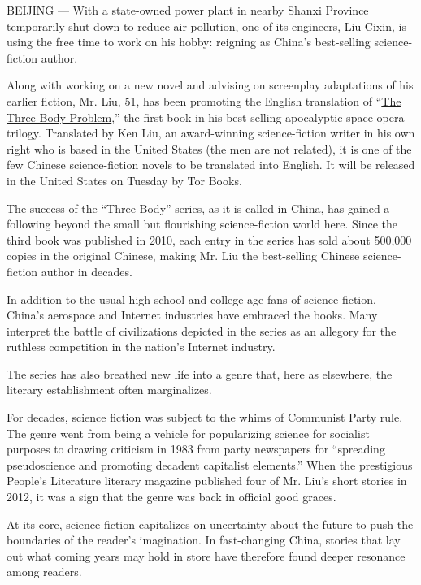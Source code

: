 BEIJING --- With a state-owned power plant in nearby Shanxi Province
temporarily shut down to reduce air pollution, one of its engineers, Liu
Cixin, is using the free time to work on his hobby: reigning as China's
best-selling science-fiction author.

Along with working on a new novel and advising on screenplay adaptations
of his earlier fiction, Mr. Liu, 51, has been promoting the English
translation of
``\href{http://www.tor.com/blogs/2014/10/repost-the-worst-of-all-possible-universes-and-the-best-of-all-possible-earths-three-body-and-chinese-science-fiction}{The
Three-Body Problem},'' the first book in his best-selling apocalyptic
space opera trilogy. Translated by Ken Liu, an award-winning
science-fiction writer in his own right who is based in the United
States (the men are not related), it is one of the few Chinese
science-fiction novels to be translated into English. It will be
released in the United States on Tuesday by Tor Books.

The success of the ``Three-Body'' series, as it is called in China, has
gained a following beyond the small but flourishing science-fiction
world here. Since the third book was published in 2010, each entry in
the series has sold about 500,000 copies in the original Chinese, making
Mr. Liu the best-selling Chinese science-fiction author in decades.

In addition to the usual high school and college-age fans of science
fiction, China's aerospace and Internet industries have embraced the
books. Many interpret the battle of civilizations depicted in the series
as an allegory for the ruthless competition in the nation's Internet
industry.

The series has also breathed new life into a genre that, here as
elsewhere, the literary establishment often marginalizes.

For decades, science fiction was subject to the whims of Communist Party
rule. The genre went from being a vehicle for popularizing science for
socialist purposes to drawing criticism in 1983 from party newspapers
for ``spreading pseudoscience and promoting decadent capitalist
elements.'' When the prestigious People's Literature literary magazine
published four of Mr. Liu's short stories in 2012, it was a sign that
the genre was back in official good graces.

At its core, science fiction capitalizes on uncertainty about the future
to push the boundaries of the reader's imagination. In fast-changing
China, stories that lay out what coming years may hold in store have
therefore found deeper resonance among readers.


